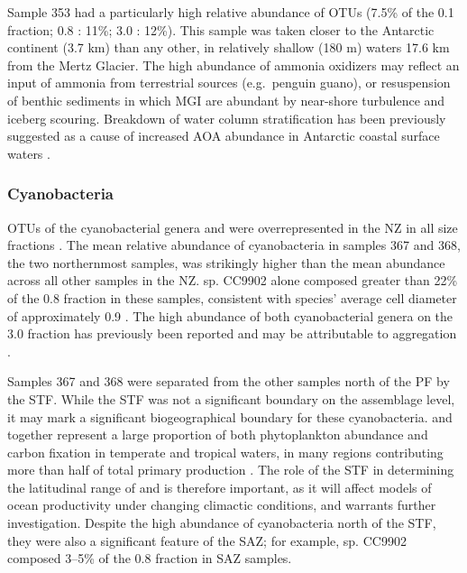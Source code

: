 Sample 353 had a particularly high relative abundance of  \acp{OTU} (7.5\% of the 0.1 \micron{} fraction; 0.8 \micron: 11\%; 3.0 \micron: 12\%).
This sample was taken closer to the Antarctic continent (3.7 km) than any other, in relatively shallow (180 m) waters 17.6 km from the Mertz Glacier.
The high abundance of ammonia oxidizers may reflect an input of ammonia from terrestrial sources (e.g.\ penguin guano), or resuspension of benthic sediments in which \ac{MGI} are abundant \cite{Bowman:2003fa} by near-shore turbulence and iceberg scouring.
Breakdown of water column stratification has been previously suggested as a cause of increased \ac{AOA} abundance in Antarctic coastal surface waters \cite{Kalanetra:2009bv}.

\subsubsection{Cyanobacteria}

\acp{OTU} of the cyanobacterial genera  and  were overrepresented in the \ac{NZ} in all size fractions .
The mean relative abundance of cyanobacteria in samples 367 and 368, the two northernmost samples, was strikingly higher than the mean abundance across all other samples in the \ac{NZ}.
 sp. CC9902 alone composed greater than 22\% of the 0.8 \micron{} fraction in these samples, consistent with  species' average cell diameter of approximately 0.9 \micron.
The high abundance of both cyanobacterial genera on the 3.0 \micron{} fraction has previously been reported \cite{Lauro:2010jna} and may be attributable to aggregation \cite{Lomas:2011bp}.

Samples 367 and 368 were separated from the other samples north of the \ac{PF} by the \ac{STF}.
While the \ac{STF} was not a significant boundary on the assemblage level, it may mark a significant biogeographical boundary for these cyanobacteria.
 and  together represent a large proportion of both phytoplankton abundance and carbon fixation in temperate and tropical waters, in many regions contributing more than half of total primary production \cite{Liu:1997ub,Liu:1998tk,Andre:1999uh}.
The role of the \ac{STF} in determining the latitudinal range of  and  is therefore important, as it will affect models of ocean productivity under changing climactic conditions, and warrants further investigation.
Despite the high abundance of cyanobacteria north of the \ac{STF}, they were also a significant feature of the \ac{SAZ}; for example,  sp. CC9902 composed 3--5\% of the 0.8 \micron{} fraction in \ac{SAZ} samples.

